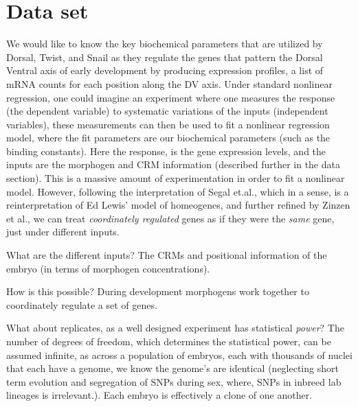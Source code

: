  \section{Data set }

We would like to know the key biochemical parameters that are utilized by Dorsal, Twist, and Snail as they regulate the genes that pattern the Dorsal Ventral axis of early development by producing expression profiles, a list of mRNA counts for each position along the DV axis.  Under standard nonlinear regression, one could imagine an experiment where one measures the response (the dependent variable) to systematic variations of the inputs (independent variables), these measurements can then be used to fit a nonlinear regression model, where the fit parameters are our biochemical parameters (such as the binding constants).  Here the response, is the gene expression levels, and the inputs are the morphogen and CRM information (described further in the data section).  This is a massive amount of experimentation in order to fit a nonlinear model.  However, following the interpretation of Segal et.al.\cite{pmid18172436}, which in a sense, is a reinterpretation of Ed Lewis' model of homeogenes, and further refined by Zinzen et al.\cite{pmid16750631}, we can treat \emph{coordinately regulated} genes as if they were the \emph{same} gene, just under different inputs.  

What are the different inputs? The CRMs and positional information of the embryo (in terms of morphogen concentrations).  

How is this possible?  During development morphogens work together to coordinately regulate a set of genes.  

What about replicates, as a well designed experiment has statistical \emph{power}?  The number of degrees of freedom, which determines the statistical power, can be assumed infinite, as across a population of embryos, each with thousands of nuclei that each have a genome, we know the genome's are identical (neglecting short term evolution and segregation of SNPs during sex, where, SNPs in inbreed lab lineages is irrelevant.).  Each embryo is effectively a clone of one another.  

